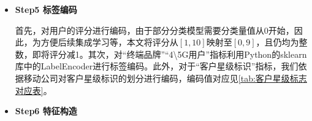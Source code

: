 \documentclass{MathorCupmodeling}
\begin{document}
\begin{itemize}
		\item \textbf{Step5 标签编码}
		
		首先，对用户的评分进行编码，由于部分分类模型需要分类量值从0开始，因此，为方便后续集成学习等，本文将评分从$\left[1,10\right]$映射至$\left[0,9\right]$，且仍均为整数，即将评分减1。其次，对“终端品牌”“4\textbackslash{}5G用户”指标利用Python的sklearn库中的LabelEncoder进行标签编码。此外，对于“客户星级标识”指标，我们依据移动公司对客户星级标识的划分进行编码，编码值对应见\textcolor{blue}{\cref{tab:客户星级标志对应表}}。
		\begin{table}[htbp]
			\centering
			\caption{客户星级标识编码对应表}\label{tab:客户星级标志对应表}
		\end{table}

		\item \textbf{Step6 特征构造}
		

\end{itemize}
\end{document}
